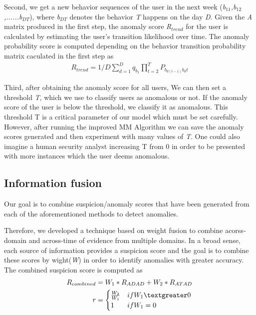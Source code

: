 \documentclass[conference]{IEEEtran}
\begin{document}
Second, we get a new behavior sequences of the user in the next week (\emph{b$_{11}$,b$_{12}$,......b$_{DT}$}), where \emph{b$_{DT}$} denotes the behavior \emph{T} happens on the day \emph{D}. Given the \emph{A} matrix produced in the first step, the anomaly score \emph{R$_{trend}$} for the user is calculated by estimating the user’s transition likelihood over time. The anomaly probability score is computed depending on the behavior transition probability matrix caculated in the first step as
\begin{align}
R_{trend}=1/D\sum_{d=1}^D {q_{b_1}\prod_{t=2}^T P_{b_{d(t-1)}b_dt}}
\end{align}

Third, after obtaining the anomaly score for all users, 
We can then set a threshold \emph{T}, which we use to classify users as anomalous or not. If the anomaly score of the user is below the threshold, we classify it as anomalous. This threshold T is a critical parameter of our model which must be set carefully.
However, after running the improved MM Algorithm we can save the anomaly scores generated and then experiment with many values of \emph{T}. One could also imagine a human security analyst increasing T from 0 in order to be presented with more instances which the user deems anomalous.

\fi
\subsection{Information fusion}
Our goal is to combine suspicion/anomaly scores that have been generated from each of the aforementioned methods to detect anomalies.

Therefore, we developed a technique based on weight fusion to combine acorss-domain and across-time of evidence from multiple domains. In a broad sense, each source of information provides a suspicion score and the goal is to combine these scores by wight(\emph{W}) in order to identify anomalies with greater accuracy. The combined suspicion score is computed as
\begin{align}
R_{combined}&= W_1*R_{ADAD}+W_2*R_{ATAD}\\
r&=\begin{cases}
\frac{W_2}{W_1}
&\mbox{if } W_1 \textgreater 0\\
1
&\mbox{if } W_1 = 0\\
\end{cases}
\end{align}
\end{document}
